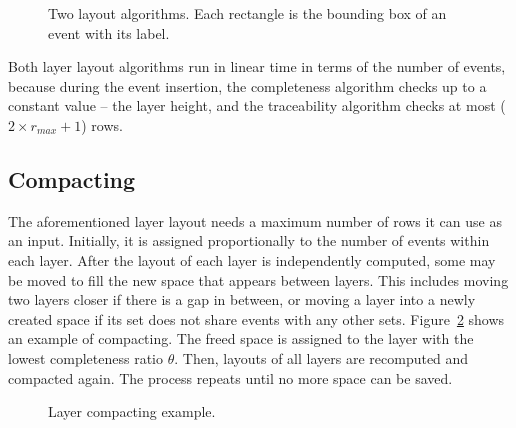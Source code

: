 \begin{figure}[ht]
\centering
	\hfill
\caption{Two layout algorithms. Each rectangle is the bounding box of an event with its label.}
\label{fig:traceability}
\end{figure}

Both layer layout algorithms run in linear time in terms of the number of events, because during the event insertion, the completeness algorithm checks up to a constant value -- the layer height, and the traceability algorithm checks at most ($2 \times r_{max}+1$) rows.

\subsection{Compacting}
\label{sub:compact}
The aforementioned layer layout needs a maximum number of rows it can use as an input. Initially, it is assigned proportionally to the number of events within each layer. After the layout of each layer is independently computed, some may be moved to fill the new space that appears between layers. This includes moving two layers closer if there is a gap in between, or moving a layer into a newly created space if its set does not share events with any other sets. Figure~\ref{fig:compacting} shows an example of compacting. The freed space is assigned to the layer with the lowest completeness ratio $\theta$. Then, layouts of all layers are recomputed and compacted again. The process repeats until no more space can be saved. 

\begin{figure}[ht]
	\centering
	\hfill
	\caption{Layer compacting example.}
	\label{fig:compacting}
\end{figure}

